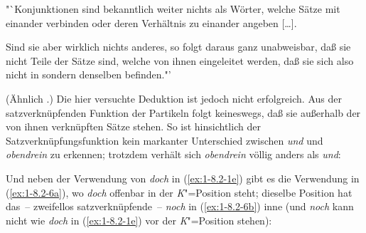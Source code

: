 \documentclass[output=paper]{langsci/langscibook}
\begin{document}
\begin{exe}
\ex\label{ex:1-8.2-4}
"`Konjunktionen sind bekanntlich weiter nichts als Wörter, welche Sätze
mit einander verbinden oder deren Verhältnis zu einander angeben [\ldots].

Sind sie aber wirklich nichts anderes, so folgt daraus ganz unabweisbar,
daß sie nicht Teile der Sätze sind, welche von ihnen eingeleitet werden,
daß sie sich also nicht in sondern  denselben befinden."' \citep[4]{Nordmeyer1883}
\end{exe}
(Ähnlich \citealt[35ff]{Drach1937}.) Die hier versuchte Deduktion ist jedoch nicht erfolgreich. Aus der satzverknüpfenden Funktion der Partikeln folgt keineswegs, daß sie
außerhalb der von ihnen verknüpften Sätze stehen. So ist hinsichtlich der Satzverknüpfungsfunktion kein markanter Unterschied zwischen \textit{und} und \textit{obendrein} zu erkennen; trotzdem verhält sich \textit{obendrein} völlig anders als \textit{und}:


\begin{exe}
\ex\label{ex:1-8.2-5}
\begin{xlist}
\end{xlist}
\end{exe}
Und neben der Verwendung von \textit{doch} in (\ref{ex:1-8.2-1e}) gibt es die Verwendung in (\ref{ex:1-8.2-6a}), wo
\textit{doch} offenbar in der \textit{K}"=Position steht; dieselbe Position hat das~-- zweifellos satzverknüpfende~– \textit{noch} in (\ref{ex:1-8.2-6b}) inne (und \textit{noch} kann nicht wie \textit{doch} in (\ref{ex:1-8.2-1e}) vor der \textit{K}"=Position stehen):
\end{document}
